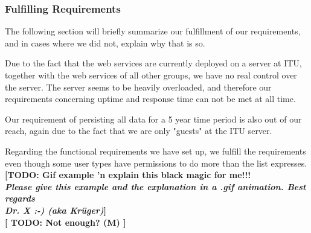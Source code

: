 \subsubsection{Fulfilling Requirements}
\label{serverfulfil}
The following section will briefly summarize our fulfillment of our requirements, and in cases where we did not, explain why that is so.

Due to the fact that the web services are currently deployed on a server at ITU, together with the web services of all other groups, we have no real control over the server. The server seems to be heavily overloaded, and therefore our requirements concerning uptime and response time can not be met at all time.

Our requirement of persisting all data for a 5 year time period is also out of our reach, again due to the fact that we are only "guests" at the ITU server.

Regarding the functional requirements we have set up, we fulfill the requirements even though some user types have permissions to do more than the list expresses.
\textbf{[TODO: Gif example 'n explain this black magic for me!!! \\\textit{Please give this example and the explanation in a .gif animation. Best regards\\Dr. X :-) (aka Krüger)}]}\\
\textbf{[ TODO: Not enough? (M) ]}